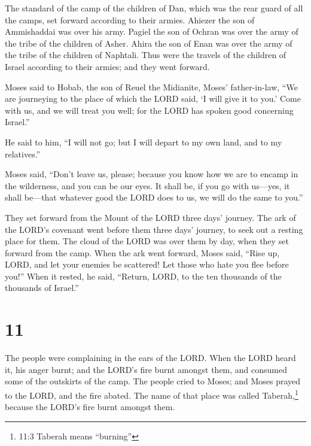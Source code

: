  The standard of the camp of the children of Dan, which was
the rear guard of all the camps, set forward according to their armies.
Ahiezer the son of Ammishaddai was over his army.  Pagiel
the son of Ochran was over the army of the tribe of the children of
Asher.  Ahira the son of Enan was over the army of the
tribe of the children of Naphtali.  Thus were the travels
of the children of Israel according to their armies; and they went
forward.

 Moses said to Hobab, the son of Reuel the Midianite,
Moses' father-in-law, ``We are journeying to the place of which the LORD
said, `I will give it to you.' Come with us, and we will treat you well;
for the LORD has spoken good concerning Israel.''

 He said to him, ``I will not go; but I will depart to my
own land, and to my relatives.''

 Moses said, ``Don't leave us, please; because you know how
we are to encamp in the wilderness, and you can be our eyes.
 It shall be, if you go with us---yes, it shall be---that
whatever good the LORD does to us, we will do the same to you.''

 They set forward from the Mount of the LORD three days'
journey. The ark of the LORD's covenant went before them three days'
journey, to seek out a resting place for them.  The cloud
of the LORD was over them by day, when they set forward from the camp.
 When the ark went forward, Moses said, ``Rise up, LORD,
and let your enemies be scattered! Let those who hate you flee before
you!''  When it rested, he said, ``Return, LORD, to the ten
thousands of the thousands of Israel.''

\hypertarget{section-10}{%
\section{11}\label{section-10}}

 The people were complaining in the ears of the LORD. When
the LORD heard it, his anger burnt; and the LORD's fire burnt amongst
them, and consumed some of the outskirts of the camp.  The
people cried to Moses; and Moses prayed to the LORD, and the fire
abated.  The name of that place was called
Taberah,\footnote{11:3 Taberah means ``burning''} because the LORD's
fire burnt amongst them.


